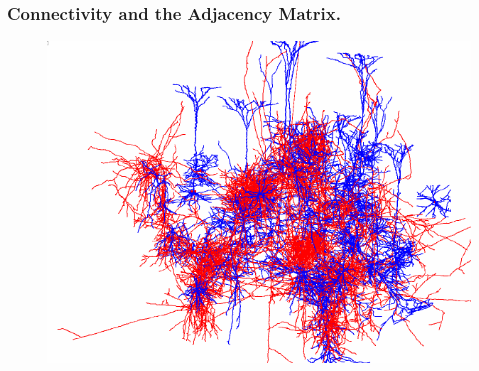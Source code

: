 \documentclass{beamer}
\begin{document}
\begin{frame}
\frametitle{Connectivity and the Adjacency Matrix.}



\begin{figure}
\centering
\begin{minipage}{0.45\linewidth}

\includegraphics[scale=0.24]{pasted35}



\end{minipage}
\begin{minipage}{0.45\linewidth}
\centering
\end{minipage}
\end{figure}
\fontsize{8pt}{8pt}\selectfont {}                  
\begin{figure}
\begin{minipage}{0.45\linewidth}
\centering
\end{minipage}
\begin{minipage}{0.45\linewidth}
\centering
\end{minipage}
\end{figure}

\end{frame}
\end{document}
